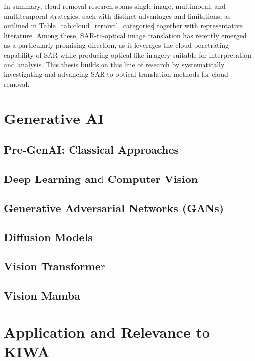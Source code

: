 In summary, cloud removal research spans single-image, multimodal, and multitemporal strategies, each with distinct advantages and limitations, as outlined in Table~\ref{tab:cloud_removal_categories} together with representative literature. Among these, SAR-to-optical image translation has recently emerged as a particularly promising direction, as it leverages the cloud-penetrating capability of SAR while producing optical-like imagery suitable for interpretation and analysis. This thesis builds on this line of research by systematically investigating and advancing SAR-to-optical translation methods for cloud removal.

\section{Generative AI}
\subsection{Pre-GenAI: Classical Approaches}
\subsection{Deep Learning and Computer Vision}
\subsection{Generative Adversarial Networks (GANs)}
\subsection{Diffusion Models}
\subsection{Vision Transformer}
\subsection{Vision Mamba}

\section{Application and Relevance to KIWA}


